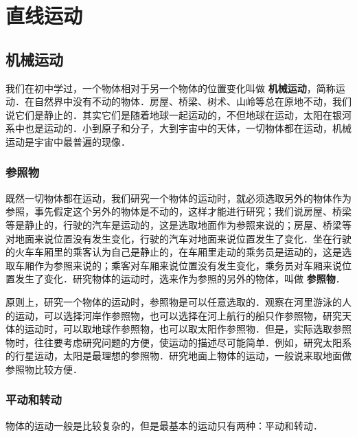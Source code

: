 \chapter{直线运动}


\begin{Topic}

\section{机械运动}

我们在初中学过，一个物体相对于另一个物体的位置变化叫做\textbf{ 机械运动}，简称运动．在自然界中没有不动的物体．房屋、桥梁、树术、山岭等总在原地不动，我们说它们是静止的．其实它们是随着地球一起运动的，不但地球在运动，太阳在银河系中也是运动的．小到原子和分子，大到宇宙中的天体，一切物体都在运动，机械运动是宇宙中最普遍的现像．
\subsection{参照物}
既然一切物体都在运动，我们研究一个物体的运动时，就必须选取另外的物体作为参照，事先假定这个另外的物体是不动的，这样才能进行研究；我们说房屋、桥梁等是静止的，行驶的汽车是运动的，这是选取地面作为参照来说的；房屋、桥梁等对地面来说位置没有发生变化，行驶的汽车对地面来说位置发生了变化．坐在行驶的火车车厢里的乘客认为自己是静止的，在车厢里走动的乘务员是运动的，这是选取车厢作为参照来说的；乘客对车厢来说位置没有发生变化，乘务员对车厢来说位置发生了变化．研究物体的运动时，选来作为参照的另外的物体，叫做\textbf{ 参照物}．

原则上，研究一个物体的运动时，参照物是可以任意选取的．观察在河里游泳的人的运动，可以选择河岸作参照物，也可以选择在河上航行的船只作参照物，研究天体的运动时，可以取地球作参照物，也可以取太阳作参照物．但是，实际选取参照物时，往往要考虑研究问题的方便，使运动的描述尽可能简单．例如，研究太阳系的行星运动，太阳是最理想的参照物．研究地面上物体的运动，一般说来取地面做参照物比较方便．

\subsection{平动和转动}

物体的运动一般是比较复杂的，但是最基本的运动只有两种：平动和转动．


\end{Topic}
